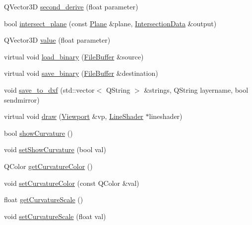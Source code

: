 \begin{DoxyCompactItemize}
\item 
Q\-Vector3\-D \hyperlink{classShipCADGeometry_1_1Spline_abe04c117432e350f3a9f66395d2d3037}{second\-\_\-derive} (float parameter)
\item 
bool \hyperlink{classShipCADGeometry_1_1Spline_afd932e0c63a3b03200ecdc7c656be8e4}{intersect\-\_\-plane} (const \hyperlink{classShipCADGeometry_1_1Plane}{Plane} \&plane, \hyperlink{classShipCADGeometry_1_1IntersectionData}{Intersection\-Data} \&output)
\item 
Q\-Vector3\-D \hyperlink{classShipCADGeometry_1_1Spline_a589d6d945e0fbb905ea94907cd216165}{value} (float parameter)
\item 
virtual void \hyperlink{classShipCADGeometry_1_1Spline_aedf951fc91bb7465959ea8dc23356cdd}{load\-\_\-binary} (\hyperlink{classShipCADGeometry_1_1FileBuffer}{File\-Buffer} \&source)
\item 
virtual void \hyperlink{classShipCADGeometry_1_1Spline_aa353db49887868aa708c310aec3537f5}{save\-\_\-binary} (\hyperlink{classShipCADGeometry_1_1FileBuffer}{File\-Buffer} \&destination)
\item 
void \hyperlink{classShipCADGeometry_1_1Spline_a8b50b6f5338b9504bd6850a605b53620}{save\-\_\-to\-\_\-dxf} (std\-::vector$<$ Q\-String $>$ \&strings, Q\-String layername, bool sendmirror)
\item 
virtual void \hyperlink{classShipCADGeometry_1_1Spline_a6424ed433d241f566c15891cc25a74dd}{draw} (\hyperlink{classShipCADGeometry_1_1Viewport}{Viewport} \&vp, \hyperlink{classShipCADGeometry_1_1LineShader}{Line\-Shader} $\ast$lineshader)
\item 
bool \hyperlink{classShipCADGeometry_1_1Spline_a15d2f95f885223099dbd2f04b43f05c9}{show\-Curvature} ()
\item 
void \hyperlink{classShipCADGeometry_1_1Spline_a2d38ce18032601fb8e94d8b0368b3954}{set\-Show\-Curvature} (bool val)
\item 
Q\-Color \hyperlink{classShipCADGeometry_1_1Spline_a9a6c37e20ea46497a2e5a8274f55514e}{get\-Curvature\-Color} ()
\item 
void \hyperlink{classShipCADGeometry_1_1Spline_a8ac4a4b3e3da9282d7b470e3937cb1e5}{set\-Curvature\-Color} (const Q\-Color \&val)
\item 
float \hyperlink{classShipCADGeometry_1_1Spline_a8af6aa0b0c11d98dfabb72f594c30151}{get\-Curvature\-Scale} ()
\item 
void \hyperlink{classShipCADGeometry_1_1Spline_a7e205cdf485b5b7c5ab7d436ea097fed}{set\-Curvature\-Scale} (float val)
\item 

\end{DoxyCompactItemize}
